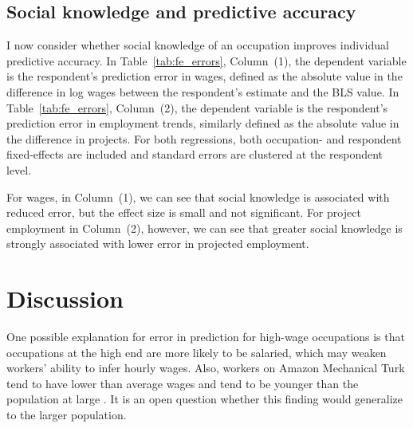 \documentclass[12pt]{article}
\begin{document}



\subsection{Social knowledge and predictive accuracy}

I now consider whether social knowledge of an occupation improves individual predictive accuracy. 
In Table~\ref{tab:fe_errors}, Column~(1), the dependent variable is the respondent's prediction error in wages, defined as the absolute value in the difference in log wages between the respondent's estimate and the BLS value.  
In Table~\ref{tab:fe_errors}, Column~(2), the dependent variable is the respondent's prediction error in employment trends, similarly defined as the absolute value in the difference in projects. 
For both regressions, both occupation- and respondent fixed-effects are included and standard errors are clustered at the respondent level.  



For wages, in Column~(1), we can see that social knowledge is associated with reduced error, but the effect size is small and not significant. 
For project employment in Column~(2), however, we can see that greater social knowledge is strongly associated with lower error in projected employment.  

\section{Discussion}

One possible explanation for error in prediction for high-wage occupations is that occupations at the high end are more likely to be salaried, which may weaken workers' ability to infer hourly wages. 
Also, workers on Amazon Mechanical Turk tend to have lower than average wages and tend to be younger than the population at large \citep{ipeirotis2010demographics}. 
It is an open question whether this finding would generalize to the larger population. 
\end{document}
